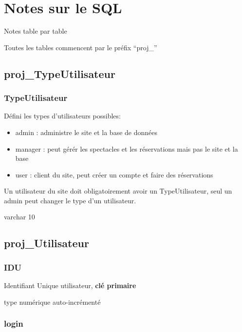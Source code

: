 \section{Notes sur le SQL}\label{notes-sur-le-sql}

Notes table par table

Toutes les tables commencent par le préfix ``proj\_''

\subsection{proj\_TypeUtilisateur}\label{projux5ftypeutilisateur}

\subsubsection{\texorpdfstring{\textbf{TypeUtilisateur}}{TypeUtilisateur}}\label{typeutilisateur}

Défini les types d'utilisateurs possibles:

\begin{itemize}
\tightlist
\item
  admin : administre le site et la base de données
\item
  manager : peut gérér les spectacles et les réservations mais pas le
  site et la base
\item
  user : client du site, peut créer un compte et faire des réservations
\end{itemize}

Un utilisateur du site doit obligatoirement avoir un TypeUtilisateur,
seul un admin peut changer le type d'un utilisateur.

varchar 10

\subsection{proj\_Utilisateur}\label{projux5futilisateur}

\subsubsection{\texorpdfstring{\textbf{IDU}}{IDU}}\label{idu}

Identifiant Unique utilisateur, \textbf{clé primaire}

type numérique auto-incrémenté

\subsubsection{login}\label{login}


